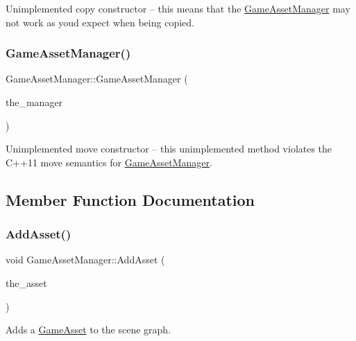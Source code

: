 Unimplemented copy constructor -- this means that the \hyperlink{classGameAssetManager}{Game\+Asset\+Manager} may not work as you\textquotesingle{}d expect when being copied. \mbox{\label{classGameAssetManager_a44f6e2fd6b8ff1dd64e5697f1be7386d}} 
\subsubsection{\texorpdfstring{Game\+Asset\+Manager()}{GameAssetManager()}\hspace{0.1cm}{\footnotesize\ttfamily [3/3]}}
{\footnotesize\ttfamily Game\+Asset\+Manager\+::\+Game\+Asset\+Manager (\begin{DoxyParamCaption}\item[{\hyperlink{classGameAssetManager}{Game\+Asset\+Manager} const \&\&}]{the\+\_\+manager }\end{DoxyParamCaption})}

Unimplemented move constructor -- this unimplemented method violates the C++11 move semantics for \hyperlink{classGameAssetManager}{Game\+Asset\+Manager}. 

\subsection{Member Function Documentation}
\mbox{\label{classGameAssetManager_ad3de8ff00d55ba04728b1de8213b2349}} 
\subsubsection{\texorpdfstring{Add\+Asset()}{AddAsset()}}
{\footnotesize\ttfamily void Game\+Asset\+Manager\+::\+Add\+Asset (\begin{DoxyParamCaption}\item[{std\+::shared\+\_\+ptr$<$ \hyperlink{classGameAsset}{Game\+Asset} $>$}]{the\+\_\+asset }\end{DoxyParamCaption})}

Adds a \hyperlink{classGameAsset}{Game\+Asset} to the scene graph. \mbox{\label{classGameAssetManager_a32837132bd70a9a9ed537323c2d3d886}} 
